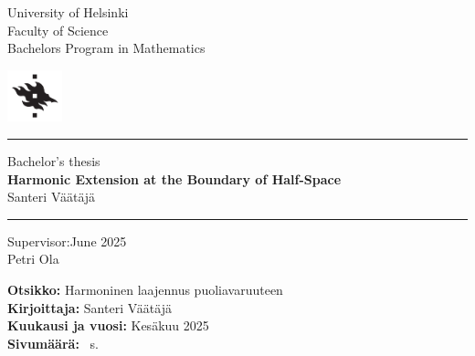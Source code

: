 \documentclass[a4paper, 11pt]{report}
\theoremstyle{plain}
\theoremstyle{definition}
\theoremstyle{remark}
\begin{document}
%
%
\begin{titlepage}

\noindent
\begin{minipage}[b]{\textwidth-45pt}
University of Helsinki\\
Faculty of Science\\
Bachelors Program in Mathematics
\end{minipage}
\hfill\includegraphics[width=45pt]{HYlogo.pdf}

\vspace{4pt}\hrule\vfill

\begin{center}
Bachelor's thesis\\[8pt]

{\huge\bfseries Harmonic Extension at the Boundary of Half-Space}\\[8pt]

Santeri Väätäjä
\end{center}

\vfill\hrule\vspace{4pt}

\noindent
Supervisor:\hfill June 2025\\
Petri Ola\\
\end{titlepage}

%
%
\cleardoublepage

\noindent\textbf{Otsikko:} Harmoninen laajennus puoliavaruuteen\\ %
\textbf{Kirjoittaja:} Santeri Väätäjä\\ %
\textbf{Kuukausi ja vuosi:} Kesäkuu 2025\\ %
\textbf{Sivumäärä:} \pageref*{LastPage}~s.\\[1em] %
\end{document}
